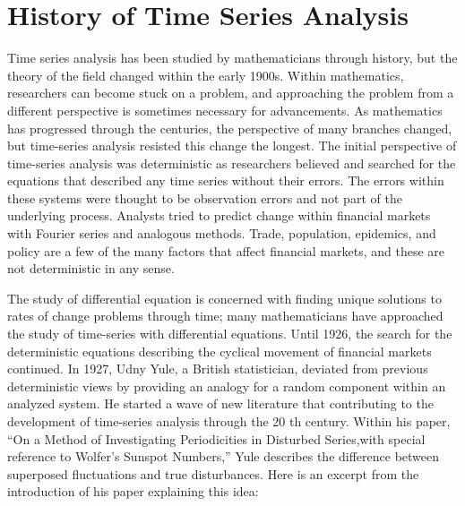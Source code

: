 \documentclass[../main.tex]{subfiles}
\begin{document}
    \section{History of Time Series Analysis}\label{sec:history-of-time-series-analysis}

    Time series analysis has been studied by mathematicians through history, but the theory of the field changed within the early 1900s.
    Within mathematics, researchers can become stuck on a problem, and approaching the problem from a different perspective is sometimes necessary for advancements.
    As mathematics has progressed through the centuries, the perspective of many branches changed, but time-series analysis resisted this change the longest.
    The initial perspective of time-series analysis was deterministic as researchers believed
    and searched for the equations that described any time series without their errors.
    The errors within these systems were thought to be observation errors and not part of the underlying process.
    Analysts tried to predict change within financial markets with Fourier series and analogous methods.
    Trade, population, epidemics, and policy are a few of the many factors
    that affect financial markets, and these are not deterministic in any sense. %

    The study of differential equation is concerned with finding unique solutions to rates of change problems through time; many mathematicians have approached the study of time-series with differential equations.
    Until 1926, the search for the deterministic equations describing the cyclical movement of financial markets continued.
    In 1927, Udny Yule, a British statistician, deviated from previous deterministic views by providing an analogy for a random component within an analyzed system.
    He started a wave of new literature that contributing to the development of time-series analysis through the 20 th century.
    Within his paper, ``On a Method of Investigating Periodicities in Disturbed Series,with special reference to Wolfer’s Sunspot Numbers,'' Yule describes the difference between superposed fluctuations and true disturbances.
    Here is an excerpt from the introduction of his paper explaining this idea:
\end{document}
